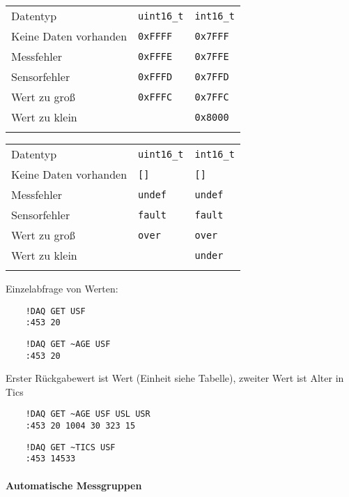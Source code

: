 \begin{tabular}{lll}
	\mytoprule
	Datentyp & \verb|uint16_t| & \verb|int16_t| \\
	\mymidrule
	Keine Daten vorhanden & \verb|0xFFFF| & \verb|0x7FFF| \\
	Messfehler & \verb|0xFFFE| & \verb|0x7FFE| \\
	Sensorfehler & \verb|0xFFFD| & \verb|0x7FFD| \\
	Wert zu groß  & \verb|0xFFFC| & \verb|0x7FFC| \\
	Wert zu klein & & \verb|0x8000| \\
	\mybottomrule
\end{tabular}

\begin{tabular}{lll}
	\mytoprule
	Datentyp & \verb|uint16_t| & \verb|int16_t| \\
	\mymidrule
	Keine Daten vorhanden & \verb|[]| & \verb|[]| \\
	Messfehler & \verb|undef| & \verb|undef| \\
	Sensorfehler & \verb|fault| & \verb|fault| \\
	Wert zu groß  & \verb|over| & \verb|over| \\
	Wert zu klein & & \verb|under| \\
	\mybottomrule
\end{tabular}


Einzelabfrage von Werten:
\begin{verbatim}
	!DAQ GET USF
	:453 20
\end{verbatim}


\begin{verbatim}
	!DAQ GET ~AGE USF
	:453 20
\end{verbatim}

Erster Rückgabewert ist Wert (Einheit siehe Tabelle), zweiter Wert ist Alter in Tics

\begin{verbatim}
	!DAQ GET ~AGE USF USL USR
	:453 20 1004 30 323 15
\end{verbatim}



\begin{verbatim}
	!DAQ GET ~TICS USF
	:453 14533
\end{verbatim}


\paragraph{Automatische Messgruppen}

